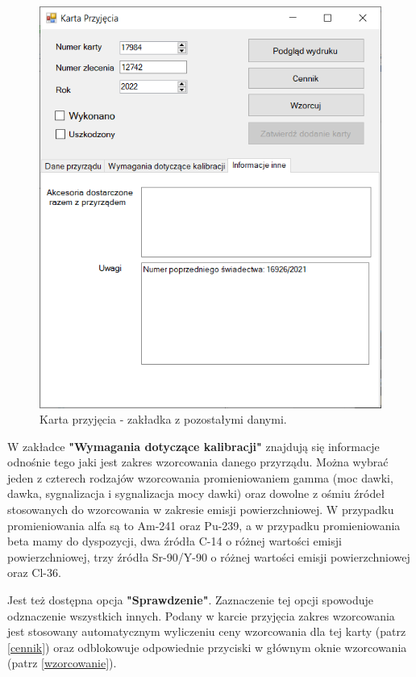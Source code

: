  \begin{figure}[H]
 	\centering
 	\includegraphics{obrazki/Biuro/karta/karta_dane_inne.png}
 	\caption{Karta przyjęcia - zakładka z pozostałymi danymi.}
 	\label{kartaDaneInne}
 \end{figure}

W zakładce \textbf{"Wymagania dotyczące kalibracji"} znajdują się informacje odnośnie tego jaki jest zakres wzorcowania danego przyrządu. Można wybrać jeden z czterech rodzajów wzorcowania promieniowaniem gamma (moc dawki, dawka, sygnalizacja i sygnalizacja mocy dawki) oraz dowolne z ośmiu źródeł stosowanych do wzorcowania w zakresie emisji powierzchniowej. W przypadku promieniowania alfa są to Am-241 oraz Pu-239, a w przypadku promieniowania beta mamy do dyspozycji, dwa źródła C-14 o różnej wartości emisji powierzchniowej, trzy źródła Sr-90/Y-90 o różnej wartości emisji powierzchniowej oraz Cl-36. 

Jest też dostępna opcja \textbf{"Sprawdzenie"}. Zaznaczenie tej opcji spowoduje odznaczenie wszystkich innych.
Podany w karcie przyjęcia zakres wzorcowania jest stosowany automatycznym wyliczeniu ceny wzorcowania dla tej karty (patrz \ref{cennik}) oraz odblokowuje odpowiednie przyciski w głównym oknie wzorcowania (patrz \ref{wzorcowanie}).

